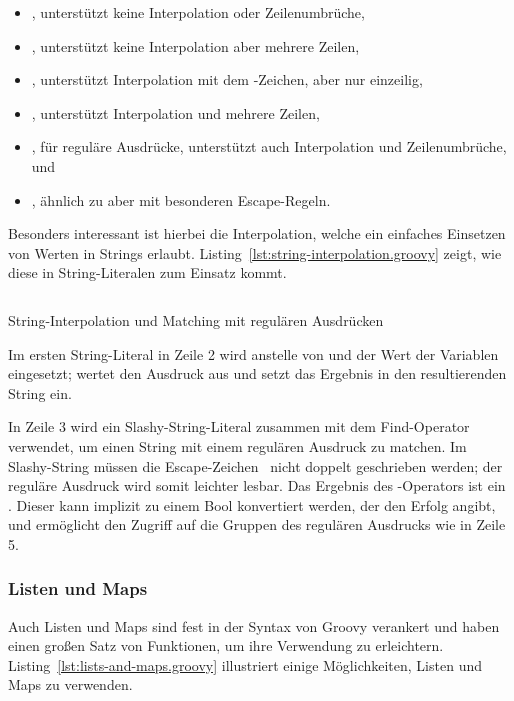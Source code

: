 \documentclass[a4paper]{article}
\newcommand{\codelisting}[3]{\begin{listing}[htp]
	\inputminted{#1}{#1/#2}
	\vspace{-3ex}
	\caption{#3}
	\label{lst:#2}
\end{listing}}
\begin{document}
\begin{itemize}\setlength{\itemsep}{0pt}\setlength{\parskip}{0pt}\setlength{\parsep}{0pt}
\item {}, unterstützt keine Interpolation oder Zeilenumbrüche,
\item {}, unterstützt keine Interpolation aber mehrere Zeilen,
\item {}, unterstützt Interpolation mit dem \code{$}-Zeichen, aber nur einzeilig,
\item {}, unterstützt Interpolation und mehrere Zeilen,
\item {}, für reguläre Ausdrücke, unterstützt auch Interpolation und Zeilenumbrüche, und
\item {}, ähnlich zu  aber mit besonderen Escape-Regeln.
\end{itemize}

Besonders interessant ist hierbei die Interpolation, welche ein einfaches Einsetzen von Werten in Strings erlaubt.
Listing~\ref{lst:string-interpolation.groovy} zeigt, wie diese in String-Literalen zum Einsatz kommt.

\codelisting{groovy}{string-interpolation.groovy}{String-Interpolation und Matching mit regulären Ausdrücken}

Im ersten String-Literal in Zeile 2 wird anstelle von  und  der Wert der Variablen eingesetzt;
 wertet den Ausdruck  aus und setzt das Ergebnis in den resultierenden String ein.

In Zeile 3 wird ein Slashy-String-Literal zusammen mit dem Find-Operator \code{=~} verwendet, um einen String mit einem regulären Ausdruck zu matchen.
Im Slashy-String müssen die Escape-Zeichen~\plain{\ } nicht doppelt geschrieben werden; der reguläre Ausdruck wird somit leichter lesbar.
Das Ergebnis des \code{=~}-Operators ist ein .
Dieser kann implizit zu einem Bool konvertiert werden, der den Erfolg angibt, und ermöglicht den Zugriff auf die Gruppen des regulären Ausdrucks wie in Zeile 5.

\subsubsection{Listen und Maps}\label{subsubsec:listen-und-maps}

Auch Listen und Maps sind fest in der Syntax von Groovy verankert und haben einen großen Satz von Funktionen, um ihre Verwendung zu erleichtern.
Listing~\ref{lst:lists-and-maps.groovy} illustriert einige Möglichkeiten, Listen und Maps zu verwenden.
\end{document}
